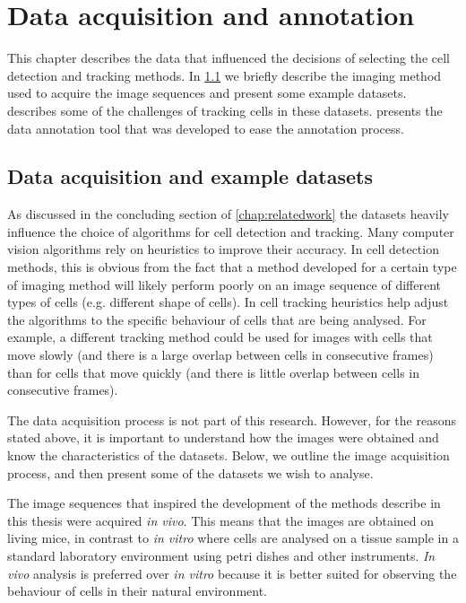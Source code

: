 \chapter{Data acquisition and annotation \statusfirstdraft}
	\label{chap:data}
	
	This chapter describes the data that influenced the decisions of selecting the cell detection and tracking methods. In \cref{sec:data_examples} we briefly describe the imaging method used to acquire the image sequences and present some example datasets.  describes some of the challenges of tracking cells in these datasets.  presents the data annotation tool that was developed to ease the annotation process.

    \section{Data acquisition and example datasets }
    \label{sec:data_examples}
    
    As discussed in the concluding section of \cref{chap:relatedwork} the datasets heavily influence the choice of algorithms for cell detection and tracking. Many computer vision algorithms rely on heuristics to improve their accuracy. In cell detection methods, this is obvious from the fact that a method developed for a certain type of imaging method will likely perform poorly on an image sequence of different types of cells (e.g. different shape of cells). In cell tracking heuristics help adjust the algorithms to the specific behaviour of cells that are being analysed. For example, a different tracking method could be used for images with cells that move slowly (and there is a large overlap between cells in consecutive frames) than for cells that move quickly (and there is little overlap between cells in consecutive frames).
    
    The data acquisition process is not part of this research. However, for the reasons stated above, it is important to understand how the images were obtained and know the characteristics of the datasets. Below, we outline the image acquisition process, and then present some of the datasets we wish to analyse.
    
    The image sequences that inspired the development of the methods describe in this thesis were acquired \textit{in vivo}. This means that the images are obtained on living mice, in contrast to \textit{in vitro} where cells are analysed on a tissue sample in a standard laboratory environment using petri dishes and other instruments. \textit{In vivo} analysis is preferred over \textit{in vitro} because it is better suited for observing the behaviour of cells in their natural environment.
    
